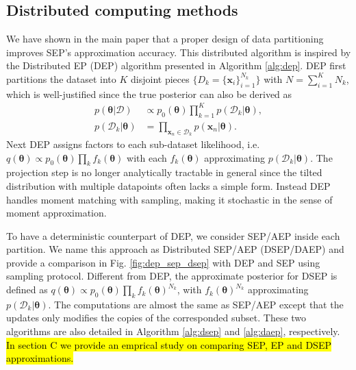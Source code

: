 \documentclass{article} %
\begin{document}
\subsection{Distributed computing methods}
We have shown in the main paper that a proper design of data partitioning improves SEP's approximation accuracy. This distributed algorithm is inspired by the Distributed EP (DEP) algorithm \cite{gelman:dep, xu:sms} presented in Algorithm \ref{alg:dep}. DEP first partitions the dataset into $K$ disjoint pieces $\{ D_k = \{\bm{x}_i\}_{i=1}^{N_k} \}$ with $N = \sum_{i=1}^K N_k$, which is well-justified since the true posterior can also be derived as
\begin{align}
p(\bm{\theta}|\mathcal{D}) &\propto p_0(\bm{\theta}) \prod_{k=1}^K p(\mathcal{D}_k|\bm{\theta}), \\
p(\mathcal{D}_k|\bm{\theta}) &= \prod_{\bm{x}_n \in \mathcal{D}_k} p(\bm{x}_n | \bm{\theta}).
\end{align}
%
Next DEP assigns factors to each sub-dataset likelihood, i.e.~$q(\bm{\theta}) \propto p_0(\bm{\theta}) \prod_k f_k(\bm{\theta})$ with each $f_k(\bm{\theta})$ approximating $p(\mathcal{D}_k|\bm{\theta})$. The projection step is no longer analytically tractable in general since the tilted distribution with multiple datapoints often lacks a simple form. Instead DEP handles moment matching with sampling, making it stochastic in the sense of moment approximation. 

%
To have a deterministic counterpart of DEP, we consider SEP/AEP inside each partition. We name this approach as Distributed SEP/AEP (DSEP/DAEP) and provide a comparison in Fig. \ref{fig:dep_sep_dsep} with DEP and SEP using sampling protocol. Different from DEP, the approximate posterior for DSEP is defined as $q(\bm{\theta}) \propto p_0(\bm{\theta}) \prod_k f_k(\bm{\theta})^{N_k}$, with $f_k(\bm{\theta})^{N_k}$ approximating $p(\mathcal{D}_k|\bm{\theta})$. The computations are almost the same as SEP/AEP except that the updates only modifies the copies of the corresponded subset.
%
These two algorithms are also detailed in Algorithm \ref{alg:dsep} and \ref{alg:daep}, respectively. \hl{In section C we provide an emprical study on comparing SEP, EP and DSEP approximations.}
\end{document}
